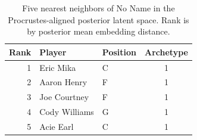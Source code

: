 \begin{table}[htbp]
  \centering\small
  \begin{tabular}{rllc}
    \toprule
    Rank & Player & Position & Archetype \\
    \midrule
    1 & Eric Mika & C & 1 \\
    2 & Aaron Henry & F & 1 \\
    3 & Joe Courtney & F & 1 \\
    4 & Cody Williams & G & 1 \\
    5 & Acie Earl & C & 1 \\
    \bottomrule
  \end{tabular}
  \caption{Five nearest neighbors of No Name in the Procrustes-aligned posterior latent space. Rank is by posterior mean embedding distance.}
  \label{tab:No_Name_neighbors}
\end{table}

